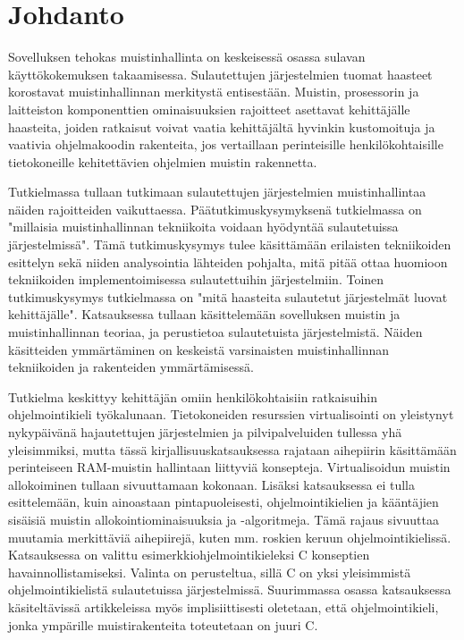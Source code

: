\chapter{Johdanto} \label{Johdanto}

Sovelluksen tehokas muistinhallinta on keskeisessä osassa sulavan käyttökokemuksen takaamisessa. Sulautettujen järjestelmien tuomat haasteet korostavat muistinhallinnan merkitystä entisestään. Muistin, prosessorin ja laitteiston komponenttien ominaisuuksien rajoitteet asettavat kehittäjälle haasteita, joiden ratkaisut voivat vaatia kehittäjältä hyvinkin kustomoituja ja vaativia ohjelmakoodin rakenteita, jos vertaillaan perinteisille henkilökohtaisille tietokoneille kehitettävien ohjelmien muistin rakennetta.

Tutkielmassa tullaan tutkimaan sulautettujen järjestelmien muistinhallintaa näiden rajoitteiden vaikuttaessa. Päätutkimuskysymyksenä tutkielmassa on "millaisia muistinhallinnan tekniikoita voidaan hyödyntää sulautetuissa järjestelmissä". Tämä tutkimuskysymys tulee käsittämään erilaisten tekniikoiden esittelyn sekä niiden analysointia lähteiden pohjalta, mitä pitää ottaa huomioon tekniikoiden implementoimisessa sulautettuihin järjestelmiin. Toinen tutkimuskysymys tutkielmassa on "mitä haasteita sulautetut järjestelmät luovat kehittäjälle". Katsauksessa tullaan käsittelemään sovelluksen muistin ja muistinhallinnan teoriaa, ja perustietoa sulautetuista järjestelmistä. Näiden käsitteiden ymmärtäminen on keskeistä varsinaisten muistinhallinnan tekniikoiden ja rakenteiden ymmärtämisessä.

Tutkielma keskittyy kehittäjän omiin henkilökohtaisiin ratkaisuihin ohjelmointikieli työkalunaan. Tietokoneiden resurssien virtualisointi on yleistynyt nykypäivänä hajautettujen järjestelmien ja pilvipalveluiden tullessa yhä yleisimmiksi, mutta tässä kirjallisuuskatsauksessa rajataan aihepiirin käsittämään perinteiseen RAM-muistin hallintaan liittyviä konsepteja. Virtualisoidun muistin allokoiminen tullaan sivuuttamaan kokonaan. Lisäksi katsauksessa ei tulla esittelemään, kuin ainoastaan pintapuoleisesti, ohjelmointikielien ja kääntäjien sisäisiä muistin allokointiominaisuuksia ja -algoritmeja. Tämä rajaus sivuuttaa muutamia merkittäviä aihepiirejä, kuten mm. roskien keruun ohjelmointikielissä. Katsauksessa on valittu esimerkkiohjelmointikieleksi C konseptien havainnollistamiseksi. Valinta on perusteltua, sillä C on yksi yleisimmistä ohjelmointikielistä sulautetuissa järjestelmissä. Suurimmassa osassa katsauksessa käsiteltävissä artikkeleissa myös implisiittisesti oletetaan, että ohjelmointikieli, jonka ympärille muistirakenteita toteutetaan on juuri C.

